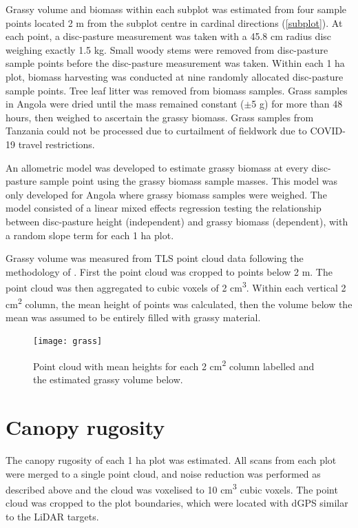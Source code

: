\documentclass[11pt,a4paper]{article}
\begin{document}
Grassy volume and biomass within each subplot was estimated from four sample points located 2 m from the subplot centre in cardinal directions (\autoref{subplot}). At each point, a disc-pasture measurement was taken with a 45.8 cm radius disc weighing exactly 1.5 kg. Small woody stems were removed from disc-pasture sample points before the disc-pasture measurement was taken. Within each 1 ha plot, biomass harvesting was conducted at nine randomly allocated disc-pasture sample points. Tree leaf litter was removed from biomass samples. Grass samples in Angola were dried until the mass remained constant ($\pm$5 g) for more than 48 hours, then weighed to ascertain the grassy biomass. Grass samples from Tanzania could not be processed due to curtailment of fieldwork due to COVID-19 travel restrictions. 

An allometric model was developed to estimate grassy biomass at every disc-pasture sample point using the grassy biomass sample masses. This model was only developed for Angola where grassy biomass samples were weighed. The model consisted of a linear mixed effects regression testing the relationship between disc-pasture height (independent) and grassy biomass (dependent), with a random slope term for each 1 ha plot. 

Grassy volume was measured from TLS point cloud data following the methodology of \citet{}. First the point cloud was cropped to points below 2 m. The point cloud was then aggregated to cubic voxels of 2 cm\textsuperscript{3}. Within each vertical 2 cm\textsuperscript{2} column, the mean height of points was calculated, then the volume below the mean was assumed to be entirely filled with grassy material.

\begin{figure}[H]
\centering
	\texttt{[image: grass]}
	\caption{Point cloud with mean heights for each 2 cm\textsuperscript{2} column labelled and the estimated grassy volume below.}
	\label{grass}
\end{figure}

\section{Canopy rugosity}

The canopy rugosity of each 1 ha plot was estimated. All scans from each plot were merged to a single point cloud, and noise reduction was performed as described above and the cloud was voxelised to 10 cm\textsuperscript{3} cubic voxels. The point cloud was cropped to the plot boundaries, which were located with dGPS similar to the LiDAR targets. 
\end{document}

